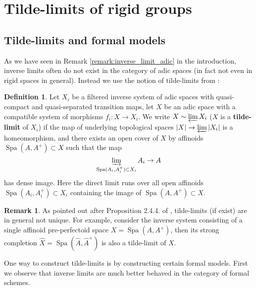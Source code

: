 \documentclass[10pt,oneside]{amsart}
\theoremstyle{definition}
\newtheorem{definition}[theorem]{Definition}
\newtheorem{remark}[theorem]{Remark}
\begin{document}
	
	\section{Tilde-limits of rigid groups} \label{section:tilde_limit}
  
	

		\subsection{Tilde-limits and formal models} 
		
	As we have seen in Remark \ref{remark:inverse_limit_adic} in the introduction, inverse limits often do not exist in the category of adic spaces (in fact not even in rigid spaces in general). Instead we use the notion of tilde-limits from \cite{SW}:
	
	\begin{definition} 
Let $X_i$ be a filtered inverse system of adic spaces with quasi-compact and quasi-separated transition maps, let $X$ be an adic space with a compatible system of morphisms $f_i: X \rightarrow X_i$. We write $X \sim \varprojlim X_i$ ($X$ is a \textbf{tilde-limit} of $X_i$) if the map of underlying topological spaces $|X| \rightarrow \varprojlim |X_i|$ is a homeomorphism, and there exists an open cover of $X$ by affinoids $\operatorname{Spa} (A, A^+) \subset X$ such that the map 
$$ \varinjlim_{\operatorname{Spa}(A_i, A_i^+) \subset X_i} A_i \rightarrow A$$
has dense image. Here the direct limit runs over all open affinoids $\operatorname{Spa}(A_i, A_i^+) \subset X_i$ containing the image of $\operatorname{Spa}(A, A^+) \subset X$.
	\end{definition}
	
	\begin{remark} \label{remark:tilde_limit_non_unique}
As pointed out after Proposition 2.4.4. of \cite{SW}, tilde-limits (if exist) are in general not unique. For example, consider the inverse system consisting of a single affinoid pre-perfectoid space $X = \operatorname{Spa}(A, A^+)$, then its strong completion $\hat X = \operatorname{Spa}(\hat A,\hat A^+) $ is also a tilde-limit of $X$. 
	\end{remark}
	
One way to construct tilde-limits is by constructing certain formal models. First we observe that inverse limits are much better behaved in the category of formal schemes. 
\end{document}
